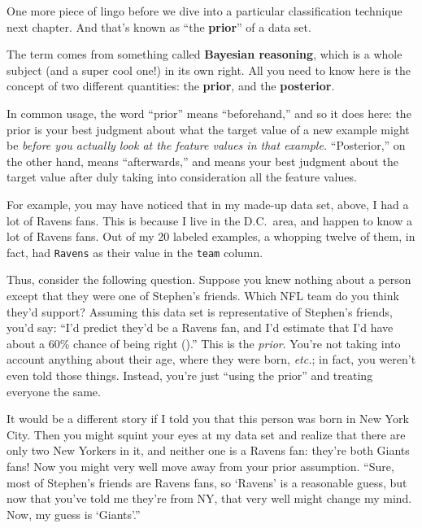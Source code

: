 \label{prior}

One more piece of lingo before we dive into a particular classification
technique next chapter. And that's known as ``the \textbf{prior}'' of a data
set.


The term comes from something called \textbf{Bayesian reasoning}, which is a
whole subject (and a super cool one!) in its own right. All you need to know
here is the concept of two different quantities: the \textbf{prior}, and the
\textbf{posterior}.

In common usage, the word ``prior'' means ``beforehand,'' and so it does here:
the prior is your best judgment about what the target value of a new example
might be \textit{before you actually look at the feature values in that
example.} ``Posterior,'' on the other hand, means ``afterwards,'' and means
your best judgment about the target value after duly taking into consideration
all the feature values.

For example, you may have noticed that in my made-up data set, above, I had a
lot of Ravens fans. This is because I live in the D.C.~area, and happen to know
a lot of Ravens fans. Out of my 20 labeled examples, a whopping twelve of them,
in fact, had \texttt{Ravens} as their value in the \texttt{team} column.

Thus, consider the following question. Suppose you knew nothing about a person
except that they were one of Stephen's friends. Which NFL team do you think
they'd support? Assuming this data set is representative of Stephen's friends,
you'd say: ``I'd predict they'd be a Ravens fan, and I'd estimate that I'd
have about a 60\% chance of being right ().'' This is the
\textit{prior}. You're not taking into account anything about their age, where
they were born, \textit{etc.}; in fact, you weren't even told those things.
Instead, you're just ``using the prior'' and treating everyone the same.

It would be a different story if I told you that this person was born in New
York City. Then you might squint your eyes at my data set and realize that
there are only two New Yorkers in it, and neither one is a Ravens fan:
they're both Giants fans! Now you might very well move away from your prior
assumption. ``Sure, most of Stephen's friends are Ravens fans, so `Ravens'
is a reasonable guess, but now that you've told me they're from NY, that very
well might change my mind. Now, my guess is `Giants'.''

